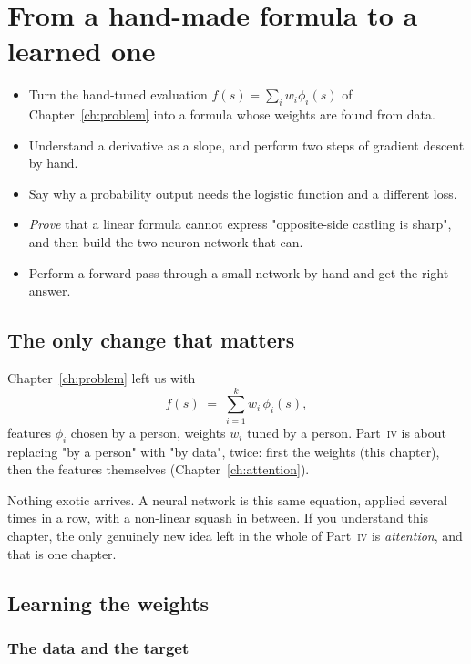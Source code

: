 \chapter{From a hand-made formula to a learned one}
\label{ch:learned}

\begin{objectives}
\begin{itemize}
\item Turn the hand-tuned evaluation $f(s) = \sum_i w_i\phi_i(s)$ of Chapter~\ref{ch:problem}
  into a formula whose weights are found from data.
\item Understand a derivative as a slope, and perform two steps of gradient descent by hand.
\item Say why a probability output needs the logistic function and a different loss.
\item \emph{Prove} that a linear formula cannot express "opposite-side castling is sharp",
  and then build the two-neuron network that can.
\item Perform a forward pass through a small network by hand and get the right answer.
\end{itemize}
\end{objectives}

\section{The only change that matters}

Chapter~\ref{ch:problem} left us with
\[
  f(s) \;=\; \sum_{i=1}^{k} w_i\,\phi_i(s) ,
\]
features $\phi_i$ chosen by a person, weights $w_i$ tuned by a person. Part~\textsc{iv} is
about replacing "by a person" with "by data", twice: first the weights (this chapter), then
the features themselves (Chapter~\ref{ch:attention}).

Nothing exotic arrives. A neural network is this same equation, applied several times in a
row, with a non-linear squash in between. If you understand this chapter, the only genuinely
new idea left in the whole of Part~\textsc{iv} is \emph{attention}, and that is one chapter.

\section{Learning the weights}

\subsection{The data and the target}

